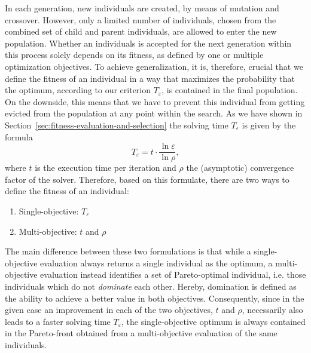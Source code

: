 In each generation, new individuals are created, by means of mutation and crossover.
However, only a limited number of individuals, chosen from the combined set of child and parent individuals, are allowed to enter the new population.
Whether an individuals is accepted for the next generation within this process solely depends on its fitness, as defined by one or multiple optimization objectives.
To achieve generalization, it is, therefore, crucial that we define the fitness of an individual in a way that maximizes the probability that the optimum, according to our criterion $T_{\varepsilon}$, is contained in the final population.
On the downside, this means that we have to prevent this individual from getting evicted from the population at any point within the search.
As we have shown in Section~\ref{sec:fitness-evaluation-and-selection} the solving time $T_{\varepsilon}$ is given by the formula
\begin{equation*}
	T_{\varepsilon} = t \cdot \frac{\ln \varepsilon}{\ln \rho},
\end{equation*}
where $t$ is the execution time per iteration and $\rho$ the (asymptotic) convergence factor of the solver.
Therefore, based on this formulate, there are two ways to define the fitness of an individual:
\begin{enumerate}
	\item Single-objective: $T_{\varepsilon}$
	\item Multi-objective:  $t$ and $\rho$
\end{enumerate}
The main difference between these two formulations is that while a single-objective evaluation always returns a single individual as the optimum, a multi-objective evaluation instead identifies a set of Pareto-optimal individual, i.e. those individuals which do not \emph{dominate} each other.
Hereby, domination is defined as the ability to achieve a better value in both objectives.
Consequently, since in the given case an improvement in each of the two objectives, $t$ and $\rho$, necessarily also leads to a faster solving time $T_{\varepsilon}$, the single-objective optimum is always contained in the Pareto-front obtained from a multi-objective evaluation of the same individuals.

